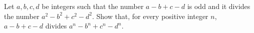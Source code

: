 Let $a,b,c,d$ be integers such that the number $a-b+c-d$ is odd and it divides the number $a^2-b^2+c^2-d^2$. Show that, for every positive integer $n$,  $a-b+c-d$ divides $a^n-b^n+c^n-d^n$.